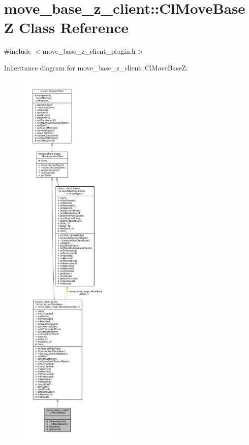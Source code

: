 \hypertarget{classmove__base__z__client_1_1ClMoveBaseZ}{}\section{move\+\_\+base\+\_\+z\+\_\+client\+:\+:Cl\+Move\+BaseZ Class Reference}
\label{classmove__base__z__client_1_1ClMoveBaseZ}


{\ttfamily \#include $<$move\+\_\+base\+\_\+z\+\_\+client\+\_\+plugin.\+h$>$}



Inheritance diagram for move\+\_\+base\+\_\+z\+\_\+client\+:\+:Cl\+Move\+BaseZ\+:
\nopagebreak
\begin{figure}[H]
\begin{center}
\leavevmode
\includegraphics[height=550pt]{classmove__base__z__client_1_1ClMoveBaseZ__inherit__graph}
\end{center}
\end{figure}


